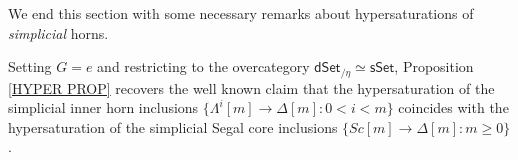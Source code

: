 \documentclass[a4paper,10pt
]{article}%
\begin{document}
%

We end this section with some necessary remarks about hypersaturations of \textit{simplicial} horns.


\begin{remark}\label{SLICE REM}
	Setting $G=e$ and restricting to the overcategory
	$\mathsf{dSet}_{/\eta} \simeq \mathsf{sSet}$,
	Proposition \ref{HYPER PROP}
	recovers the well known claim that 
	the hypersaturation of the simplicial inner horn inclusions
	$\{\Lambda^i[m] \to \Delta[m] \colon 0< i < m\}$
	coincides with the hypersaturation of the simplicial Segal core inclusions
	$\{Sc[m] \to \Delta[m]\colon m \geq 0\}$.
\end{remark}
\end{document}
